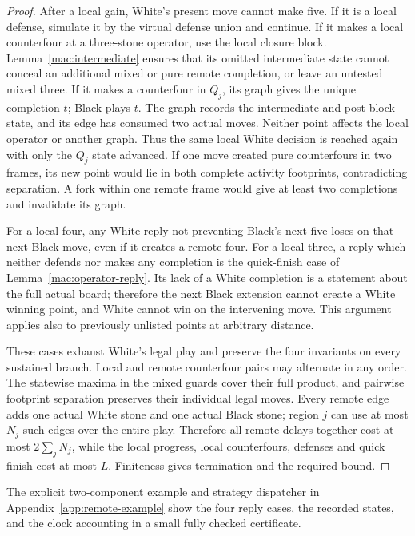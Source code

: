 \documentclass[11pt]{article}
\theoremstyle{definition}
\theoremstyle{remark}
\begin{document}
\begin{proof}
After a local gain, White's present move cannot make five. If it is a local defense, simulate it by the virtual defense union and continue. If it makes a local counterfour at a three-stone operator, use the local closure block. Lemma~\ref{mac:intermediate} ensures that its omitted intermediate state cannot conceal an additional mixed or pure remote completion, or leave an untested mixed three. If it makes a counterfour in \(Q_j\), its graph gives the unique completion \(t\); Black plays \(t\). The graph records the intermediate and post-block state, and its edge has consumed two actual moves. Neither point affects the local operator or another graph. Thus the same local White decision is reached again with only the \(Q_j\) state advanced. If one move created pure counterfours in two frames, its new point would lie in both complete activity footprints, contradicting separation. A fork within one remote frame would give at least two completions and invalidate its graph.

For a local four, any White reply not preventing Black's next five loses on that next Black move, even if it creates a remote four. For a local three, a reply which neither defends nor makes any completion is the quick-finish case of Lemma~\ref{mac:operator-reply}. Its lack of a White completion is a statement about the full actual board; therefore the next Black extension cannot create a White winning point, and White cannot win on the intervening move. This argument applies also to previously unlisted points at arbitrary distance.

These cases exhaust White's legal play and preserve the four invariants on every sustained branch. Local and remote counterfour pairs may alternate in any order. The statewise maxima in the mixed guards cover their full product, and pairwise footprint separation preserves their individual legal moves. Every remote edge adds one actual White stone and one actual Black stone; region \(j\) can use at most \(N_j\) such edges over the entire play. Therefore all remote delays together cost at most \(2\sum_jN_j\), while the local progress, local counterfours, defenses and quick finish cost at most \(L\). Finiteness gives termination and the required bound. 
\end{proof}

The explicit two-component example and strategy dispatcher in
Appendix~\ref{app:remote-example} show the four reply cases, the recorded
states, and the clock accounting in a small fully checked certificate.
\end{document}
